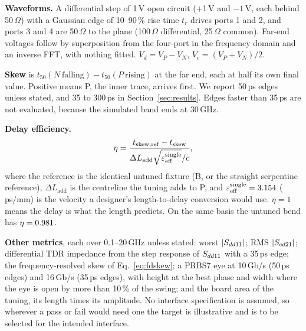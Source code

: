 \textbf{Waveforms.} A differential step of 1\,V open circuit (+1\,V and $-1$\,V, each behind 50\,$\Omega$) with a
Gaussian edge of 10--90\,\% rise time $t_r$ drives ports 1 and 2, and ports 3 and 4 are 50\,$\Omega$ to the plane
(100\,$\Omega$ differential, 25\,$\Omega$ common). Far-end voltages follow by superposition from the four-port in
the frequency domain and an inverse FFT, with nothing fitted. $V_d = V_P - V_N$, $V_c = (V_P + V_N)/2$.

\textbf{Skew} is $t_{50}(N\ \text{falling}) - t_{50}(P\ \text{rising})$ at the far end, each at half its own final
value. Positive means P, the inner trace, arrives first. We report 50\,ps edges unless stated, and 35 to 300\,ps
in Section~\ref{sec:results}. Edges faster than 35\,ps are not evaluated, because the simulated band ends at
30\,GHz.

\textbf{Delay efficiency.}
\begin{equation}
  \eta = \frac{t_\mathrm{skew,ref} - t_\mathrm{skew}}{\Delta L_\mathrm{add}\sqrt{\varepsilon_{\mathrm{eff}}^\mathrm{single}}/c},
  \label{eq:eta}
\end{equation}
where the reference is the identical untuned fixture (B, or the straight serpentine reference), $\Delta
L_\mathrm{add}$ is the centreline the tuning adds to P, and $\varepsilon_{\mathrm{eff}}^\mathrm{single} = 3.154$
(\PsPerMm\,ps/mm) is the velocity a designer's length-to-delay conversion would use. $\eta = 1$ means the delay
is what the length predicts. On the same basis the untuned bend has $\eta = 0.981$.

\textbf{Other metrics}, each over 0.1--20\,GHz unless stated: worst $|\Sdd{11}|$; RMS $|\Scd{21}|$; differential
TDR impedance from the step response of $S_{dd11}$ with a 35\,ps edge; the frequency-resolved skew of
Eq.~\eqref{eq:fdskew}; a PRBS7 eye at 10\,Gb/s (50\,ps edges) and 16\,Gb/s (35\,ps edges), with height at the
best phase and width where the eye is open by more than 10\,\% of the swing; and the board area of the tuning,
its length times its amplitude. No interface specification is assumed, so wherever a pass or fail would need one the
target is illustrative and is to be selected for the intended interface.

\begin{table}[t]
\centering
\caption{Metrics, medium mesh, 50\,ps edge. $\Delta L_\mathrm{add}$ is the centreline the tuning adds to P;
$\eta$ is Eq.~\eqref{eq:eta}; MTL is the line model's skew; $|\Sdd{11}|$ and $|\Scd{21}|$ over 0.1--20\,GHz;
$Z_\mathrm{diff}$ from TDR. Skew bounds: each variant's own where it was solved on three or more meshes; $^\dagger$~borrowed from the
converged variant whose smallest features it shares, not a convergence result for this variant
(Section~\ref{sec:verification}).}
\label{tab:metrics}
\footnotesize
{}
\end{table}

